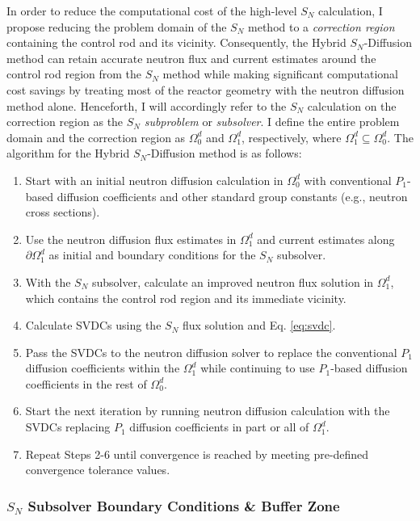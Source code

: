 In order to reduce the computational cost of the high-level $S_N$ calculation, I propose reducing
the problem domain of the $S_N$ method to a \textit{correction region} containing the control rod
and its vicinity. Consequently, the Hybrid $S_N$-Diffusion method can retain accurate neutron flux
and current estimates around the control rod region from the $S_N$ method while making significant
computational cost savings by treating most of the reactor geometry with the neutron diffusion
method alone. Henceforth, I will accordingly refer to the $S_N$ calculation on the correction
region as the $S_N$ \textit{subproblem} or \textit{subsolver}. I define the entire problem
domain and the correction region as $\Omega^d_0$ and $\Omega^d_1$, respectively, where
$\Omega^d_1\subseteq\Omega^d_0$. The algorithm for the Hybrid $S_N$-Diffusion method is as follows:
%
\begin{enumerate}
  \item Start with an initial neutron diffusion calculation in $\Omega^d_0$ with conventional
    $P_1$-based diffusion coefficients and other standard group constants (e.g., neutron cross
    sections).
  \item Use the neutron diffusion flux estimates in $\Omega^d_1$ and current estimates along
    $\partial \Omega^d_1$ as initial and boundary conditions for the $S_N$ subsolver.
  \item With the $S_N$ subsolver, calculate an improved neutron flux solution in $\Omega^d_1$,
    which contains the control rod region and its immediate vicinity.
  \item Calculate \glspl{SVDC} using the $S_N$ flux solution and Eq. \ref{eq:svdc}.
  \item Pass the \glspl{SVDC} to the neutron diffusion solver to replace the conventional
    $P_1$ diffusion coefficients within the $\Omega^d_1$ while continuing to use $P_1$-based
    diffusion coefficients in the rest of $\Omega^d_0$.
  \item Start the next iteration by running neutron diffusion calculation with the \glspl{SVDC}
    replacing $P_1$ diffusion coefficients in part or all of $\Omega^d_1$.
  \item Repeat Steps 2-6 until convergence is reached by meeting pre-defined convergence tolerance
    values.
\end{enumerate}

\subsubsection{$S_N$ Subsolver Boundary Conditions \& Buffer Zone}

